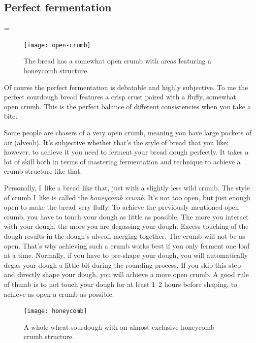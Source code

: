 \subsection{Perfect fermentation}=

\begin{figure}
  \texttt{[image: open-crumb]}
  \caption{The bread has a somewhat open crumb with areas
  featuring a honeycomb structure.}%
  \label{fig:open-crumb}
\end{figure}

Of course the perfect fermentation is debatable and highly subjective. To
me the perfect sourdough bread features a crisp crust paired with a fluffy,
somewhat open crumb. This is the perfect balance of different consistencies
when you take a bite.

Some people are chasers of a very open crumb, meaning you have large pockets
of air (alveoli). It's subjective whether that's the style of bread that you like;
however, to achieve it you need to ferment your bread dough perfectly.
It takes a lot of skill both in terms of mastering fermentation and technique
to achieve a crumb structure like that.

Personally, I~like a bread like that, just with a slightly less wild crumb.
The style of crumb I~like is called the \emph{honeycomb crumb}. It's not too open, but
just enough open to make the bread very fluffy. To achieve the previously mentioned open crumb, you
have to touch your dough as little as possible. The more you interact with your
dough, the more you are degassing your dough. Excess touching of the dough
results in the dough's alveoli merging together. The crumb will not be as open.
That's why achieving such a crumb works best if you only ferment
one loaf at a time. Normally, if you have to pre-shape your dough,
you will automatically degas your dough a little bit during the rounding process.
If you skip this step and directly shape your dough, you will achieve a more open crumb.
A good rule of thumb is to not touch your dough for at least 1--2 hours before shaping,
to achieve as open a crumb as possible.

\begin{figure}
  \texttt{[image: honeycomb]}
  \caption{A whole wheat sourdough with an almost exclusive honeycomb crumb
  structure.}%
  \label{fig:honeycomb}
\end{figure}


